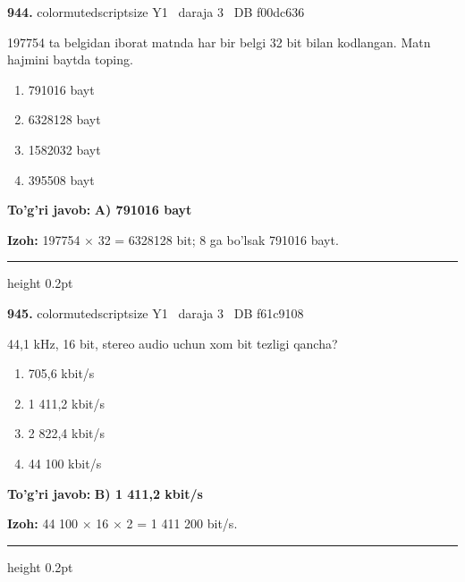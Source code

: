 \documentclass[10pt,a4paper,oneside]{article}
\begin{document}
\noindent\textbf{\color{ink}944.}  {color{muted}scriptsize Y1 \textbullet\ daraja 3 \textbullet\ DB f00dc636}
\par
197754 ta belgidan iborat matnda har bir belgi 32 bit bilan kodlangan. Matn hajmini baytda toping.
\begin{enumerate}[label=\Alph*),leftmargin=9mm]
\item 791016 bayt
\item 6328128 bayt
\item 1582032 bayt
\item 395508 bayt
\end{enumerate}
\begin{tcolorbox}[enhanced,breakable,colback=teal!4,colframe=teal!50!black,boxrule=0.5pt,arc=1.1mm,left=3mm,right=3mm,top=1.7mm,bottom=1.7mm,before skip=2mm,after skip=2mm]
\textbf{\color{teal}To'g'ri javob:} \textbf{A) 791016 bayt}
\par\smallskip
\textbf{Izoh:} 197754 \ensuremath{\times} 32 = 6328128 bit; 8 ga bo'lsak 791016 bayt.
\end{tcolorbox}
\vspace{2mm}\hrule height 0.2pt \vspace{3mm}

\noindent\textbf{\color{ink}945.}  {color{muted}scriptsize Y1 \textbullet\ daraja 3 \textbullet\ DB f61c9108}
\par
44,1 kHz, 16 bit, stereo audio uchun xom bit tezligi qancha?
\begin{enumerate}[label=\Alph*),leftmargin=9mm]
\item 705,6 kbit/s
\item 1 411,2 kbit/s
\item 2 822,4 kbit/s
\item 44 100 kbit/s
\end{enumerate}
\begin{tcolorbox}[enhanced,breakable,colback=teal!4,colframe=teal!50!black,boxrule=0.5pt,arc=1.1mm,left=3mm,right=3mm,top=1.7mm,bottom=1.7mm,before skip=2mm,after skip=2mm]
\textbf{\color{teal}To'g'ri javob:} \textbf{B) 1 411,2 kbit/s}
\par\smallskip
\textbf{Izoh:} 44 100 \ensuremath{\times} 16 \ensuremath{\times} 2 = 1 411 200 bit/s.
\end{tcolorbox}
\vspace{2mm}\hrule height 0.2pt \vspace{3mm}
\end{document}
